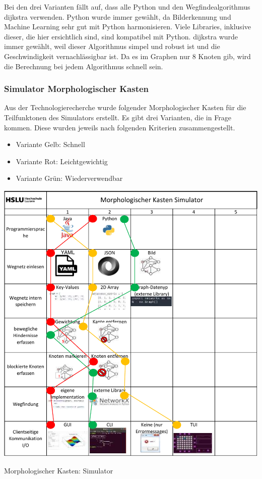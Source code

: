Bei den drei Varianten fällt auf, dass alle Python und den Wegfindealgorithmus \gls{dijkstra} verwenden. Python wurde immer gewählt, da Bilderkennung und Machine Learning sehr gut mit Python harmonisieren. Viele Libraries, inklusive dieser, die hier ersichtlich sind, sind kompatibel mit Python. \gls{dijkstra} wurde immer gewählt, weil dieser Algorithmus simpel und robust ist und die Geschwindigkeit vernachlässigbar ist. Da es im Graphen nur 8 Knoten gib, wird die Berechnung bei jedem Algorithmus schnell sein.

\subsubsection*{Simulator Morphologischer Kasten}\label{mk-simulator}



Aus der Technologierecherche wurde folgender Morphologischer Kasten für die Teilfunktonen des Simulators erstellt. Es gibt drei Varianten, die in Frage kommen. Diese wurden jeweils nach folgenden Kriterien zusammengestellt.

\begin{itemize}
    \item Variante Gelb: Schnell
    \item Variante Rot: Leichtgewichtig
    \item Variante Grün: Wiederverwendbar
\end{itemize}


\begin{table}[H]
\centering
\includegraphics[width=\textwidth]{assets/MK_Simulator.pdf}
\caption{Morphologischer Kasten: Simulator}
\label{table:mk-simulator}
\end{table}



